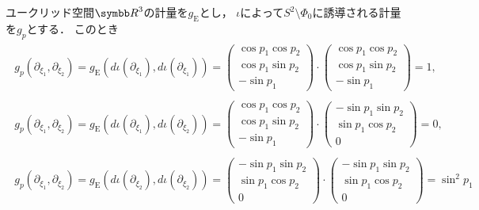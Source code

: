 \documentclass{ltjsarticle}
\begin{document}
ユークリッド空間\({\Real}^3\)の計量を\(g_\text{E}\)とし，
\(\iota\)によって\(S^2 \setminus \Phi_0\)に誘導される計量を\(g_p\)とする．
このとき
\begin{gather*}
    \begin{split}
    g_p(\partial_{\xi_1}, \partial_{\xi_2})
    =
    g_\text{E}(d\iota(\partial_{\xi_1}), d\iota(\partial_{\xi_1}))
    =
    \begin{pmatrix}
        \cos p_1 \cos p_2 \\
        \cos p_1 \sin p_2 \\
        - \sin p_1
    \end{pmatrix}
    \cdot
    \begin{pmatrix}
        \cos p_1 \cos p_2 \\
        \cos p_1 \sin p_2 \\
        - \sin p_1
    \end{pmatrix}
    = 1,
    \end{split} \\
    \begin{split}
    g_p(\partial_{\xi_1}, \partial_{\xi_2})
    =
    g_\text{E}(d\iota (\partial_{\xi_1}), d\iota (\partial_{\xi_2}))
    =
    \begin{pmatrix}
        \cos p_1 \cos p_2 \\
        \cos p_1 \sin p_2 \\
        - \sin p_1
    \end{pmatrix}
    \cdot
    \begin{pmatrix}
        - \sin p_1 \sin p_2 \\
        \sin p_1 \cos p_2 \\
        0
    \end{pmatrix}
    = 0,
    \end{split} \\
    \begin{split}
    g_p(\partial_{\xi_1}, \partial_{\xi_2})
    = g_\text{E}(d\iota (\partial_{\xi_2}), d\iota (\partial_{\xi_2}))
    =
    \begin{pmatrix}
        - \sin p_1 \sin p_2 \\
        \sin p_1 \cos p_2 \\
        0
    \end{pmatrix}
    \cdot
    \begin{pmatrix}
        - \sin p_1 \sin p_2 \\
        \sin p_1 \cos p_2 \\
        0
    \end{pmatrix}
    = \sin^2 p_1
    \end{split}
\end{gather*}
\end{document}
